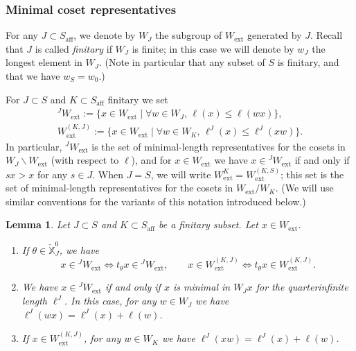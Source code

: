 \documentclass[11pt]{amsart}
\numberwithin{equation}{section}
\theoremstyle{plain}
\newtheorem{lem}[thm]{Lemma}
\theoremstyle{definition}
\newcommand{\X}{{\mathbb X}}
\newcommand{\Xd}{\check{\X}}
\newcommand{\ex}{\mathrm{ext}}
\newcommand{\af}{\mathrm{aff}}
\begin{document}
\subsubsection{Minimal coset representatives} 

For any $J\subset S_\af$, we denote by $W_J$ the subgroup of $W_\ex$ generated by $J$. 
Recall that $J$ is called \emph{finitary} if $W_J$ is finite; in this case
we will denote by $w_J$ the longest element in $W_J$. (Note in particular that any subset of $S$ is finitary, and that we have $w_S=w_0$.)

For $J\subset S$ and $K\subset S_\af$ finitary we set 
\begin{gather*}
{}^JW_\ex:=\{x\in W_\ex \mid 
\forall w\in W_J, \, \ell(x)\leq \ell(wx)\}, 
\\
W_\ex^{(K,J)}:=\{x\in W_\ex \mid 
\forall w\in W_K, \, \ell^{J}(x)\leq \ell^{J}(xw)\}.
\end{gather*}
In particular, ${}^J W_\ex$ is the set of minimal-length representatives for the cosets in $W_J \backslash W_\ex$ (with respect to $\ell$), and for $x \in W_\ex$ we have $x \in {}^J W_\ex$ if and only if $sx>x$ for any $s \in J$. When $J=S$, we will write $W_\ex^K=W_\ex^{(K,S)}$; this set is the set of minimal-length representatives for the cosets in $W_\ex / W_K$. (We will use similar conventions for the variants of this notation introduced below.)


\begin{lem}
\label{lem:min-length}
Let $J\subset S$ and $K\subset S_\af$ be a finitary subset. Let $x\in W_\ex$.
\begin{enumerate}
\item 
\label{it:min-length-0}
If $\theta \in \Xd_J^0$, we have
\[
x \in {}^J W_\ex \Leftrightarrow t_\theta x \in {}^J W_\ex, \qquad
x \in W_\ex^{(K,J)} \Leftrightarrow t_\theta x \in W_\ex^{(K,J)}.
\]
\item 
\label{it:min-length-1}
We have $x\in {}^JW_\ex$ if and only if $x$ is minimal in $W_Jx$ for the quarterinfinite length $\ell^J$. 
In this case, for any $w\in W_J$ we have $\ell^{J}(wx)=\ell^{J}(x)+\ell(w)$. 
\item 
\label{it:min-length-2}
If $x\in W_\ex^{(K,J)}$, for any $w\in W_K$ we have $\ell^J(xw)=\ell^J(x)+\ell(w)$. 
\end{enumerate}
\end{lem}
\end{document}
